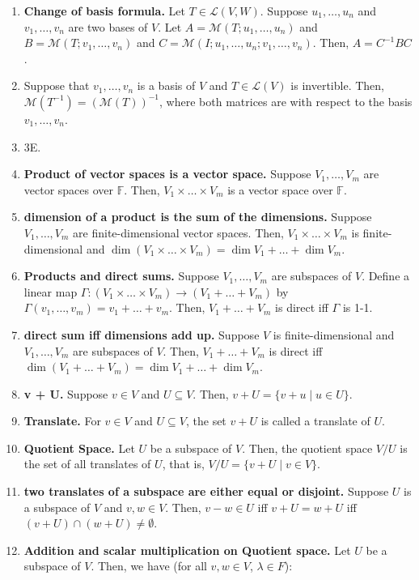 \begin{enumerate}
	\item \textbf{Change of basis formula. } Let $T \in \mathscr{L}(V,W)$. Suppose $u_1,\dots,u_n$ and $v_1,\dots,v_n$ are two bases of $V$. Let $A = \mathscr{M}(T; u_1,\dots,u_n)$ and $B = \mathscr{M}(T; v_1,\dots,v_n)$ and $C = \mathscr{M}(I; u_1,\dots,u_n; v_1,\dots,v_n)$. Then, $A = C^{-1}BC$. 
	\item Suppose that $v_1,\dots,v_n$ is a basis of $V$ and $T \in \mathscr{L}(V)$ is invertible. Then, $\mathscr{M}(T^{-1}) = (\mathscr{M}(T))^{-1}$, where both matrices are with respect to the basis $v_1,\dots,v_n$. 
	\item 3E. 
	\item \textbf{Product of vector spaces is a vector space. } Suppose $V_1,\dots,V_m$ are vector spaces over $\mathbb{F}$. Then, $V_1 \times \dots \times V_m$ is a vector space over $\mathbb{F}$. 
	\item \textbf{dimension of a product is the sum of the dimensions. } Suppose $V_1,\dots,V_m$ are finite-dimensional vector spaces. Then, $V_1 \times \dots \times V_m$ is finite-dimensional and $\dim(V_1 \times \dots \times V_m) = \dim V_1 + \dots + \dim V_m$. 
	\item \textbf{Products and direct sums. } Suppose $V_1,\dots,V_m$ are subspaces of $V$. Define a linear map $\Gamma: (V_1 \times \dots \times V_m) \to (V_1 + \dots + V_m)$ by $\Gamma(v_1,\dots,v_m) = v_1 + \dots + v_m$. Then, $V_1 + \dots + V_m$ is direct iff $\Gamma$ is 1-1. 
	\item \textbf{direct sum iff dimensions add up. } Suppose $V$ is finite-dimensional and $V_1,\dots,V_m$ are subspaces of $V$. Then, $V_1 + \dots + V_m$ is direct iff $\dim(V_1 + \dots + V_m) = \dim V_1 + \dots + \dim V_m$. 
	\item \textbf{v + U. } Suppose $v \in V$ and $U \subseteq V$. Then, $v + U = \{v + u \mid u \in U\}$. 
	\item \textbf{Translate. } For $v \in V$ and $U \subseteq V$, the set $v + U$ is called a translate of $U$. 
	\item \textbf{Quotient Space. } Let $U$ be a subspace of $V$. Then, the quotient space $V/U$ is the set of all translates of $U$, that is, $V/U = \{v + U \mid v \in V\}$. 
	\item \textbf{two translates of a subspace are either equal or disjoint. } Suppose $U$ is a subspace of $V$ and $v,w \in V$. Then, $v-w \in U$ iff $v + U = w + U$ iff $(v + U) \cap (w+U) \neq \emptyset$. 
	\item \textbf{Addition and scalar multiplication on Quotient space. } Let $U$ be a subspace of $V$. Then, we have (for all $v,w \in V$, $\lambda \in F$): 

\end{enumerate}
